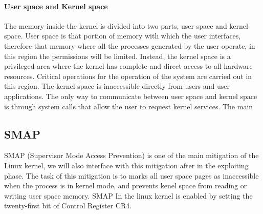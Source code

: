 \documentclass{report}
\begin{document}
    \paragraph{User space and Kernel space}
    The memory inside the kernel is divided into two parts, user space and kernel space.\newline
    User space is that portion of memory with which the user interfaces, therefore that memory where all the processes generated by the user operate, in this region the permissions will be limited.\newline
    Instead, the kernel space is a privileged area where the kernel has complete and direct access to all hardware resources.\newline
    Critical operations for the operation of the system are carried out in this region.\newline
    The kernel space is inaccessible directly from users and user applications.\newline
    The only way to communicate between user space and kernel space is through system calls that allow the user to request kernel services.\newline
    The main 
    
    \subsection{SMAP}
    SMAP (Supervisor Mode Access Prevention) is one of the main mitigation of the Linux kernel, we will also interface with this mitigation after in the exploiting phase.\newline
    The task of this mitigation is to marks all user space pages as inaccessible when the process is in kernel mode, and prevents kenel space from reading or writing user space memory.\newline
    SMAP In the linux kernel is enabled by setting the twenty-first bit of Control Register CR4.\newline
    
\end{document}
